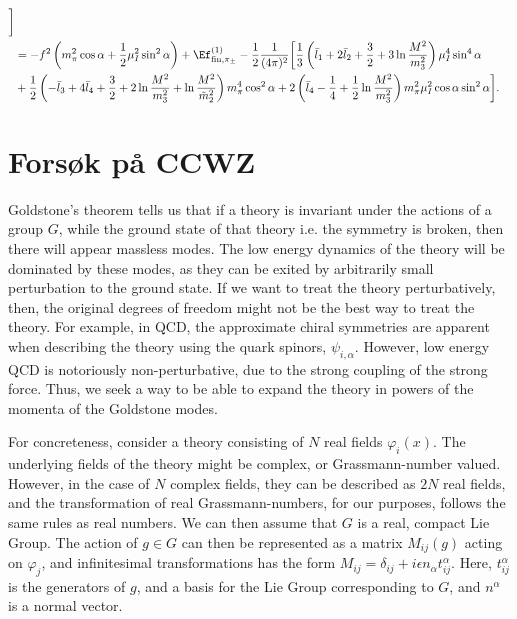 \documentclass{article}
\begin{document}
\begin{align}
    \bigg]
    \\
    &
    =
    - f^2 \left(m_\pi^2 \cos \alpha + \frac{1}{2}\mu_I^2 \sin^2 \alpha\right)
    + \Ef^{(1)}_{\mathrm{fin}, \pi_\pm}
    - \frac{1}{2}\frac{1}{(4 \pi)^2}
    \bigg[
        \frac{1}{3}
        \left( 
            \bar l_1 + 2 \bar l_2 + \frac{3}{2} + 3 \ln \frac{M^2}{m_3^2}
        \right) \mu_I^4 \sin^4 \alpha
        \\ 
        &
        +
        \frac{1}{2}
        \left(
            - \bar l_3 + 4 \bar l_4 + \frac{3}{2} + 2\ln \frac{M^2}{m_3^2}
            + \ln \frac{M^2}{\tilde m^2_2}
        \right) m_\pi^4 \cos^2\alpha 
        + 2 \left(\bar l_4 - \frac{1}{4} + \frac{1}{2}\ln \frac{M^2}{m_3^2}\right)
        m_\pi^2 \mu_I^2 \cos\alpha \sin^2 \alpha
    \bigg].
\end{align}

\section{Forsøk på CCWZ}


Goldstone's theorem tells us that if a theory is invariant under the actions of a group $G$, while the ground state of that theory i.e. the symmetry is broken, then there will appear massless modes.
The low energy dynamics of the theory will be dominated by these modes, as they can be exited by arbitrarily small perturbation to the ground state.
If we want to treat the theory perturbatively, then, the original degrees of freedom might not be the best way to treat the theory.
For example, in QCD, the approximate chiral symmetries are apparent when describing the theory using the quark spinors, $\psi_{i, \alpha}$.
However, low energy QCD is notoriously non-perturbative, due to the strong coupling of the strong force.
Thus, we seek a way to be able to expand the theory in powers of the momenta of the Goldstone modes.

For concreteness, consider a theory consisting of $N$ real fields $\varphi_i(x)$.
The underlying fields of the theory might be complex, or Grassmann-number valued.
However, in the case of $N$ complex fields, they can be described as $2N$ real fields, and the transformation of real Grassmann-numbers, for our purposes, follows the same rules as real numbers.
We can then assume that $G$ is a real, compact Lie Group. 
The action of $g\in G$ can then be represented as a matrix $M_{ij}(g)$ acting on $\varphi_j$, and infinitesimal transformations has the form $M_{ij} = \delta_{ij} + i \epsilon n_{\alpha} t^\alpha_{ij}$.
Here, $t_{ij}^\alpha$ is the generators of $g$, and a basis for the Lie Group corresponding to $G$, and $n^{\alpha}$ is a normal vector.
\end{document}
